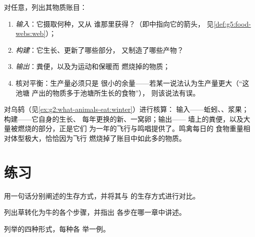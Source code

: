 \begin{method}[核算动物的物质]\label{met:g6:matter-from-food:audit}
对任意，列出其物质账目：
\begin{enumerate}
  \item \emph{输入}：它摄取何种，又从
        谁那里获得？（即中指向它的箭头，
        见\cref{def:g5:food-webs:web}）；
  \item \emph{构建}：它生长、更新了哪些部分，
        又制造了哪些产物？
  \item \emph{输出}：粪便，以及为运动和保暖而
        燃烧掉的物质；
  \item 核对平衡：生产量必须只是
        很小的余量——若某一说法认为生产量更大（“这池塘
        产出的物质多于池塘所生长的食物”），
        则该说法有误。
\end{enumerate}
\end{method}

\begin{example}[核算的应用]\label{ex:g6:matter-from-food:audituse}
对乌鸫（见\cref{ex:g2:what-animals-eat:winter}）进行核算：
输入——蚯蚓、、浆果；构建——它自身的生长、
每年更换的新、一窝卵；输出——
墙上的粪便，以及大量被燃烧的部分，正是它们
为一年的飞行与鸣唱提供了。鸣禽每日的
食物重量相对体型极大，恰恰因为飞行
燃烧掉了账目中如此多的物质。
\end{example}

\section{练习}

\begin{exercise}[$\star$]\label{exo:g6:matter-from-food:1}
用一句话分别阐述的生存方式，并将其与
的生存方式进行对比。
\end{exercise}

\begin{exercise}[$\star$]\label{exo:g6:matter-from-food:2}
列出草转化为牛的各个步骤，并指出
各步在哪一章中讲述。
\end{exercise}

\begin{exercise}[$\star$]\label{exo:g6:matter-from-food:3}
列举的四种形式，每种各
举一例。
\end{exercise}

